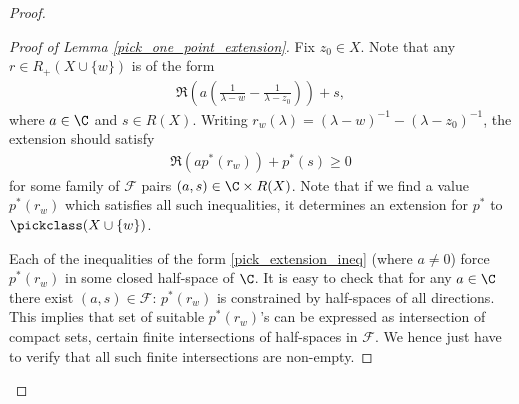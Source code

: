 \begin{proof}
	\begin{proof}[Proof of Lemma \ref{pick_one_point_extension}]
		Fix $z_{0} \in X$. Note that any $r \in R_{+}(X \cup \{w\})$ is of the form
		\begin{align*}
		\Re\left(a \left(\frac{1}{\lambda - w} - \frac{1}{\lambda - z_{0}}\right)\right) + s,
		\end{align*}
		where $a \in \C$ and $s \in R(X)$. Writing $r_{w}(\lambda) = (\lambda - w)^{-1} - (\lambda - z_{0})^{-1}$, the extension should satisfy
		\begin{align}\label{pick_extension_ineq}
			\Re\left(a p^{*}(r_{w})\right) + p^{*}(s) \geq 0
		\end{align}
		for some family of $\mathcal{F}$ pairs $(a, s) \in \C \times R(X)$. Note that if we find a value $p^{*}(r_{w})$ which satisfies all such inequalities, it determines an extension for $p^{*}$ to $\pickclass(X \cup \{w\})$.

		Each of the inequalities of the form \ref{pick_extension_ineq} (where $a \neq 0$) force $p^{*}(r_{w})$ in some closed half-space of $\C$. It is easy to check that for any $a \in \C$ there exist $(a, s) \in \mathcal{F}$: $p^{*}(r_{w})$ is constrained by half-spaces of all directions. This implies that set of suitable $p^{*}(r_{w})$'s can be expressed as intersection of compact sets, certain finite intersections of half-spaces in $\mathcal{F}$. We hence just have to verify that all such finite intersections are non-empty.


\end{proof}
\end{proof}
